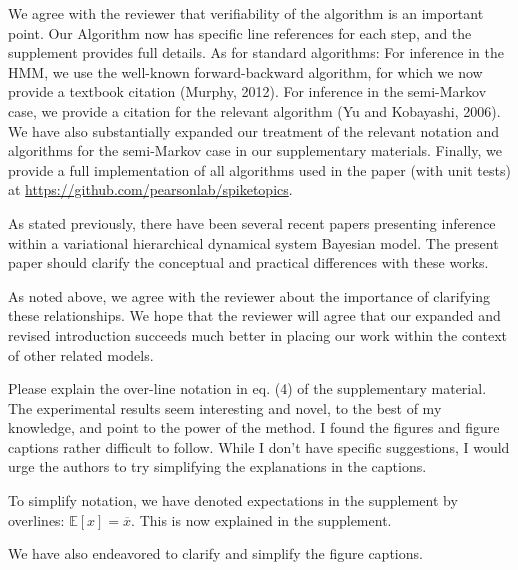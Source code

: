 \documentclass[12pt,a4paper]{article}
\newcommand{\edit}[1]{\textcolor{edit}{#1}}
\begin{document}
\edit{
We agree with the reviewer that verifiability of the algorithm is an important point. Our Algorithm now has specific line references for each step, and the supplement provides full details. As for standard algorithms:
For inference in the HMM, we use the well-known forward-backward algorithm, for which we now provide a textbook citation (Murphy, 2012). For inference in the semi-Markov case, we provide a citation for the relevant algorithm (Yu and Kobayashi, 2006). We have also substantially expanded our treatment of the relevant notation and algorithms for the semi-Markov case in our supplementary materials. Finally, we provide a full implementation of all algorithms used in the paper (with unit tests) at \url{https://github.com/pearsonlab/spiketopics}.
}

As stated previously, there have been several recent papers presenting inference within a variational hierarchical dynamical system Bayesian model. The present paper should clarify the conceptual and practical differences with these works.

\edit{
As noted above, we agree with the reviewer about the importance of clarifying these relationships. We hope that the reviewer will agree that our expanded and revised introduction succeeds much better in placing our work within the context of other related models.
}

Please explain the over-line notation in eq. (4) of the supplementary material.
The experimental results seem interesting and novel, to the best of my knowledge, and point to the power of the method. I found the figures and figure captions rather difficult to follow. While I don’t have specific suggestions, I would urge the authors to try simplifying the explanations in the captions.

\edit{
To simplify notation, we have denoted expectations in the supplement by overlines: $\mathbb{E}[x] = \overline{x}$. This is now explained in the supplement.
}

\edit{We have also endeavored to clarify and simplify the figure captions.}
\end{document}
